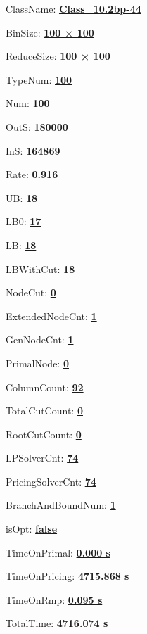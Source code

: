 \documentclass[11pt]{article}
\begin{document}
\pagestyle{empty}


ClassName: \underline{\textbf{Class_10.2bp-44}}
\par
BinSize: \underline{\textbf{100 × 100}}
\par
ReduceSize: \underline{\textbf{100 × 100}}
\par
TypeNum: \underline{\textbf{100}}
\par
Num: \underline{\textbf{100}}
\par
OutS: \underline{\textbf{180000}}
\par
InS: \underline{\textbf{164869}}
\par
Rate: \underline{\textbf{0.916}}
\par
UB: \underline{\textbf{18}}
\par
LB0: \underline{\textbf{17}}
\par
LB: \underline{\textbf{18}}
\par
LBWithCut: \underline{\textbf{18}}
\par
NodeCut: \underline{\textbf{0}}
\par
ExtendedNodeCnt: \underline{\textbf{1}}
\par
GenNodeCnt: \underline{\textbf{1}}
\par
PrimalNode: \underline{\textbf{0}}
\par
ColumnCount: \underline{\textbf{92}}
\par
TotalCutCount: \underline{\textbf{0}}
\par
RootCutCount: \underline{\textbf{0}}
\par
LPSolverCnt: \underline{\textbf{74}}
\par
PricingSolverCnt: \underline{\textbf{74}}
\par
BranchAndBoundNum: \underline{\textbf{1}}
\par
isOpt: \underline{\textbf{false}}
\par
TimeOnPrimal: \underline{\textbf{0.000 s}}
\par
TimeOnPricing: \underline{\textbf{4715.868 s}}
\par
TimeOnRmp: \underline{\textbf{0.095 s}}
\par
TotalTime: \underline{\textbf{4716.074 s}}
\par
\newpage


\end{document}
